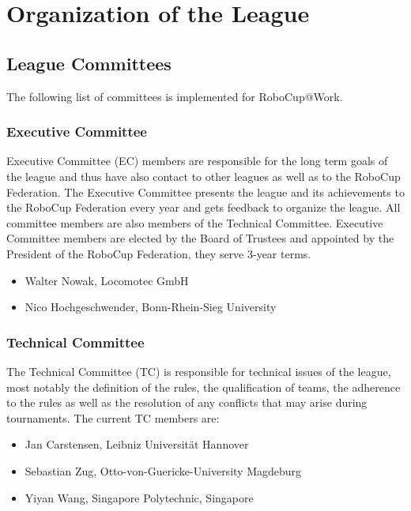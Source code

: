 \section{Organization of the League}\label{sec:organisation_of_the_league}

\subsection{League Committees}
The following list of committees is implemented for RoboCup@Work.

\subsubsection{Executive Committee}

Executive Committee (EC) members are responsible for the long term goals of the league and thus have also contact to other leagues as well as to the RoboCup Federation. The Executive Committee presents the league and its achievements to the RoboCup Federation every year and gets feedback to organize the league. All committee members are also members of the Technical Committee. Executive Committee members are elected by the Board of Trustees and appointed by the President of the RoboCup Federation, they serve 3-year terms.

\begin{itemize}
	\item Walter Nowak, Locomotec GmbH
	\item Nico Hochgeschwender, Bonn-Rhein-Sieg University
\end{itemize}


\subsubsection{Technical Committee}
The Technical Committee (TC) is responsible for technical issues of the league, most notably the definition of the rules, the qualification of teams, the adherence to the rules as well as the resolution of any conflicts that may arise during tournaments. The current TC members are:

\begin{itemize}
	\item Jan Carstensen, Leibniz Universit\"at Hannover
	\item Sebastian Zug, Otto-von-Guericke-University Magdeburg
	\item Yiyan Wang, Singapore Polytechnic, Singapore
\end{itemize}


